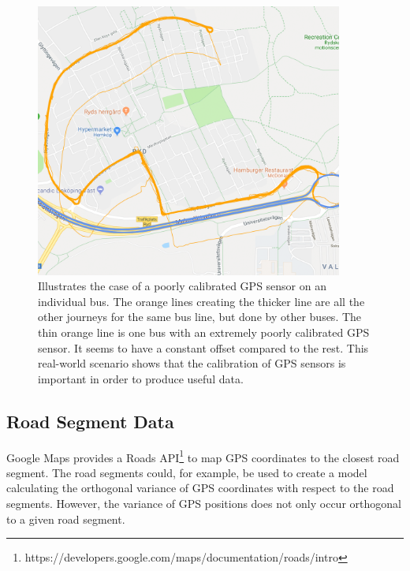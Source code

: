 \begin{figure}[ht!]
    \centering
    \includegraphics[width=0.9\textwidth]{figures/gps_sensor_calibration}
    \caption[Illustrates the case of a poorly calibrated GPS sensor on an individual bus]
    {\small Illustrates the case of a poorly calibrated GPS sensor on an individual bus.
    The orange lines creating the thicker line are all the other journeys for the same bus line, but done by other buses.
    The thin orange line is one bus with an extremely poorly calibrated GPS sensor.
    It seems to have a constant offset compared to the rest.
    This real-world scenario shows that the calibration of GPS sensors is important in order to produce useful data.}
    \label{fig:gps-sensor-calibration}
\end{figure}

\subsection{Road Segment Data}
Google Maps provides a Roads API\footnote{https://developers.google.com/maps/documentation/roads/intro} to map GPS coordinates to the closest road segment.
The road segments could, for example, be used to create a model calculating the orthogonal variance of GPS coordinates with respect to the road segments.
However, the variance of GPS positions does not only occur orthogonal to a given road segment.  

